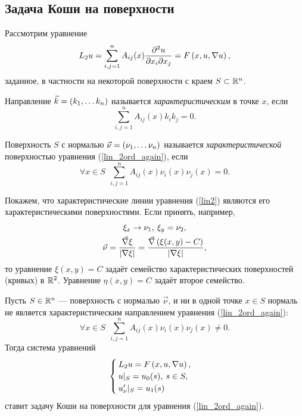 \subsection{Задача Коши на поверхности}
    Рассмотрим уравнение
    \begin{equation}
        L_2 u = \sum_{i,j = 1}^n A_{ij}(x)\frac{\partial^2u}{\partial x_i\partial x_j} = F\left({x, u, \nabla u}\right), \label{lin_2ord_again}
    \end{equation}
    заданное, в частности на некоторой поверхности с краем $S \subset \mathbb{R}^n$.
    \begin{Def}
        Направление $\vec{k} = \left({k_1,\ldots k_n}\right)$ называется \textit{характеристическим} в точке $x$, если
        \begin{equation*}
            \sum_{i,j = 1}^n A_{ij}(x) k_i k_j = 0.
        \end{equation*}
    \end{Def}
    \begin{Def}
        Поверхность $S$ с нормалью $\vec{\nu} = \left({\nu_1,\ldots \nu_n}\right)$ называется \textit{характеристической} поверхностью уравнения 
        (\ref{lin_2ord_again}), если
        \begin{equation*}
            \forall x \in S \:\: \sum_{i,j = 1}^n A_{ij}(x) \nu_i(x) \nu_j(x) = 0.
        \end{equation*}
    \end{Def}
    \begin{note}
        Покажем, что характеристические линии уравнения (\ref{lin2}) являются его характеристическими поверхностями. Если принять, например,
        \begin{gather*}
            \xi_x \rightarrow \nu_1,\: \xi_y = \nu_2,\\
            \vec{\nu} = \frac{\vec{\nabla}\xi}{\left|{\nabla \xi}\right|} = \frac{\vec{\nabla}\left({\xi(x,y) - C}\right)}{\left|{\nabla \xi}\right|},
        \end{gather*}
        то уравнение $\xi(x,y) = C$ задаёт семейство характеристических поверхностей (кривых) в $\mathbb{R}^2$. Уравнение $\eta(x,y) = C$ задаёт второе
        семейство.
    \end{note}

    \begin{Def}
        Пусть $S \in \mathbb{R}^n$ --- поверхность с нормалью $\vec{\nu}$, и ни в одной точке $x \in S$ нормаль не является характеристическим направлением
        уравнения (\ref{lin_2ord_again}):
        \begin{equation*}
            \forall x \in S \:\: \sum_{i,j = 1}^n A_{ij}(x) \nu_i(x) \nu_j(x) \not= 0.
        \end{equation*}
        Тогда система уравнений
        \begin{equation*}
            \begin{cases}
                L_2 u = F\left({x, u, \nabla u}\right), \\
                u|_S = u_0(s),\: s \in S, \\
                u'_{\nu}|_S = u_1(s)
            \end{cases}
        \end{equation*}
        ставит задачу Коши на поверхности для уравнения (\ref{lin_2ord_again}).
    \end{Def}
